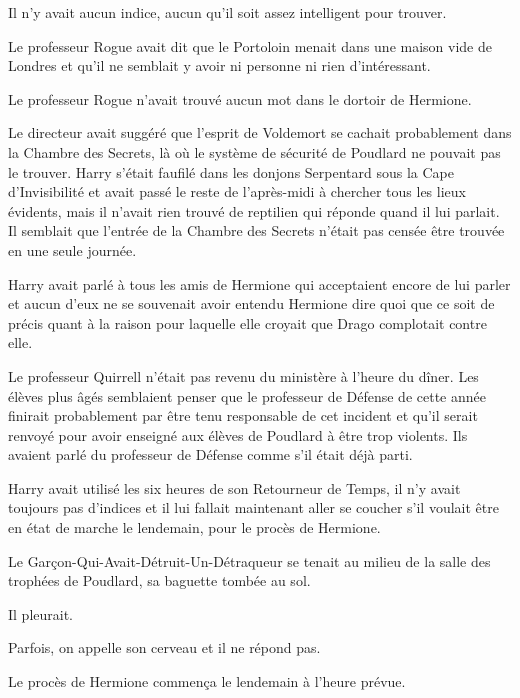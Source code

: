 Il n'y avait aucun indice, aucun qu'il soit assez intelligent pour trouver.

Le professeur Rogue avait dit que le Portoloin menait dans une maison vide de Londres et qu'il ne semblait y avoir ni personne ni rien d'intéressant.

Le professeur Rogue n'avait trouvé aucun mot dans le dortoir de Hermione.

Le directeur avait suggéré que l'esprit de Voldemort se cachait probablement dans la Chambre des Secrets, là où le système de sécurité de Poudlard ne pouvait pas le trouver. Harry s'était faufilé dans les donjons Serpentard sous la Cape d'Invisibilité et avait passé le reste de l'après-midi à chercher tous les lieux évidents, mais il n'avait rien trouvé de reptilien qui réponde quand il lui parlait. Il semblait que l'entrée de la Chambre des Secrets n'était pas censée être trouvée en une seule journée.

Harry avait parlé à tous les amis de Hermione qui acceptaient encore de lui parler et aucun d'eux ne se souvenait avoir entendu Hermione dire quoi que ce soit de précis quant à la raison pour laquelle elle croyait que Drago complotait contre elle.

Le professeur Quirrell n'était pas revenu du ministère à l'heure du dîner. Les élèves plus âgés semblaient penser que le professeur de Défense de cette année finirait probablement par être tenu responsable de cet incident et qu'il serait renvoyé pour avoir enseigné aux élèves de Poudlard à être trop violents. Ils avaient parlé du professeur de Défense comme s'il était déjà parti.

Harry avait utilisé les six heures de son Retourneur de Temps, il n'y avait toujours pas d'indices et il lui fallait maintenant aller se coucher s'il voulait être en état de marche le lendemain, pour le procès de Hermione.

Le Garçon-Qui-Avait-Détruit-Un-Détraqueur se tenait au milieu de la salle des trophées de Poudlard, sa baguette tombée au sol.

Il pleurait.

Parfois, on appelle son cerveau et il ne répond pas.

Le procès de Hermione commença le lendemain à l'heure prévue.
